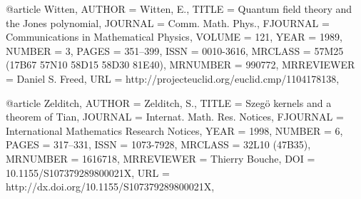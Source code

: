 @article {Witten,
    AUTHOR = {Witten, E.},
     TITLE = {Quantum field theory and the {J}ones polynomial},
   JOURNAL = {Comm. Math. Phys.},
  FJOURNAL = {Communications in Mathematical Physics},
    VOLUME = {121},
      YEAR = {1989},
    NUMBER = {3},
     PAGES = {351--399},
      ISSN = {0010-3616},
   MRCLASS = {57M25 (17B67 57N10 58D15 58D30 81E40)},
  MRNUMBER = {990772},
MRREVIEWER = {Daniel S. Freed},
       URL = {http://projecteuclid.org/euclid.cmp/1104178138},
}

@article {Zelditch,
    AUTHOR = {Zelditch, S.},
     TITLE = {Szeg\"o kernels and a theorem of {T}ian},
   JOURNAL = {Internat. Math. Res. Notices},
  FJOURNAL = {International Mathematics Research Notices},
      YEAR = {1998},
    NUMBER = {6},
     PAGES = {317--331},
      ISSN = {1073-7928},
   MRCLASS = {32L10 (47B35)},
  MRNUMBER = {1616718},
MRREVIEWER = {Thierry Bouche},
       DOI = {10.1155/S107379289800021X},
       URL = {http://dx.doi.org/10.1155/S107379289800021X},
}





